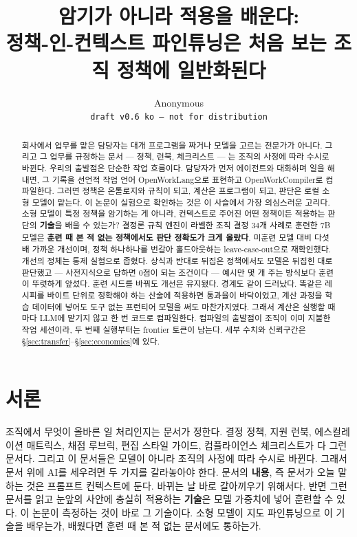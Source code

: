 \documentclass[11pt]{article}
\title{암기가 아니라 적용을 배운다: \\ 정책-인-컨텍스트 파인튜닝은 처음 보는 조직 정책에 일반화된다}
\author{Anonymous \\ \texttt{draft v0.6 ko --- not for distribution}}
\begin{document}
\maketitle

\begin{abstract}
회사에서 업무를 맡은 담당자는 대개 프로그램을 짜거나 모델을 고르는 전문가가 아니다. 그리고 그 업무를 규정하는 문서 --- 정책, 런북, 체크리스트 --- 는 조직의 사정에 따라 수시로 바뀐다. 우리의 출발점은 단순한 작업 흐름이다. 담당자가 먼저 에이전트와 대화하며 일을 해내면, 그 기록을 선언적 작업 언어 OpenWorkLang으로 표현하고 OpenWorkCompiler로 컴파일한다. 그러면 정책은 온톨로지와 규칙이 되고, 계산은 프로그램이 되고, 판단은 로컬 소형 모델이 맡는다. 이 논문이 실험으로 확인하는 것은 이 사슬에서 가장 의심스러운 고리다. 소형 모델이 특정 정책을 암기하는 게 아니라, 컨텍스트로 주어진 어떤 정책이든 적용하는 판단의 \textbf{기술}을 배울 수 있는가? 결정론 규칙 엔진이 라벨한 조직 결정 34개 사례로 훈련한 7B 모델은 \textbf{훈련 때 본 적 없는 정책에서도 판단 정확도가 크게 올랐다}. 미훈련 모델 대비 다섯 배 가까운 개선이며, 정책 하나하나를 번갈아 홀드아웃하는 leave-case-out으로 재확인했다. 개선의 정체는 통제 실험으로 좁혔다. 상식과 반대로 뒤집은 정책에서도 모델은 뒤집힌 대로 판단했고 --- 사전지식으로 답하면 0점이 되는 조건이다 --- 예시만 몇 개 주는 방식보다 훈련이 뚜렷하게 앞섰다. 훈련 시드를 바꿔도 개선은 유지됐다. 경계도 같이 드러났다. 똑같은 레시피를 바이트 단위로 정확해야 하는 산술에 적용하면 통과율이 바닥이었고, 계산 과정을 학습 데이터에 넣어도 도구 없는 프런티어 모델을 써도 마찬가지였다. 그래서 계산은 실행할 때마다 LLM에 맡기지 않고 한 번 코드로 컴파일한다. 컴파일의 출발점이 조직이 이미 지불한 작업 세션이라, 두 번째 실행부터는 frontier 토큰이 남는다. 세부 수치와 신뢰구간은 \S\ref{sec:transfer}--\S\ref{sec:economics}에 있다.
\end{abstract}

\section{서론}

조직에서 무엇이 올바른 일 처리인지는 문서가 정한다. 결정 정책, 지원 런북, 에스컬레이션 매트릭스, 채점 루브릭, 편집 스타일 가이드, 컴플라이언스 체크리스트가 다 그런 문서다. 그리고 이 문서들은 모델이 아니라 조직의 사정에 따라 수시로 바뀐다. 그래서 문서 위에 AI를 세우려면 두 가지를 갈라놓아야 한다. 문서의 \textbf{내용}, 즉 문서가 오늘 말하는 것은 프롬프트 컨텍스트에 둔다. 바뀌는 날 바로 갈아끼우기 위해서다. 반면 그런 문서를 읽고 눈앞의 사안에 충실히 적용하는 \textbf{기술}은 모델 가중치에 넣어 훈련할 수 있다. 이 논문이 측정하는 것이 바로 그 기술이다. 소형 모델이 지도 파인튜닝으로 이 기술을 배우는가, 배웠다면 훈련 때 본 적 없는 문서에도 통하는가.
\end{document}
